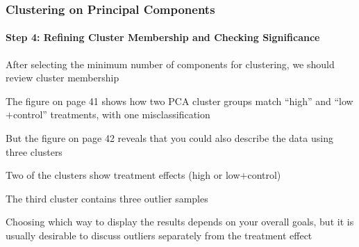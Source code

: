 \documentclass[10pt]{beamer}
\begin{document}
\begin{frame}[fragile]
\frametitle{Clustering on Principal Components}
\framesubtitle{Step 4: Refining Cluster Membership and Checking Significance}

\bi
\item After selecting the minimum number of components for clustering,
  we should review cluster membership

\item The figure on page 41 %
shows how two PCA cluster
  groups match ``high'' and ``low$+$control'' treatments, with one
  misclassification

\item But the figure on page 42 %
reveals that you
  could also describe the data using three clusters

\bi
\item Two of the clusters show treatment
  effects (high or low$+$control)
\item The third cluster contains three outlier samples
\ei

\item Choosing which way to display the results depends on your
  overall goals, but it is usually desirable to discuss outliers
  separately from the treatment effect
\ei

\end{frame}
\end{document}
